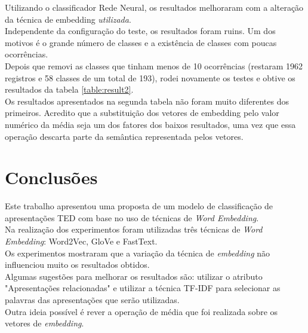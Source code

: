 \documentclass{article}
\begin{document}
Utilizando o classificador Rede Neural, os resultados melhoraram com a alteração da técnica de embedding \textit{utilizada}.\\

Independente da configuração do teste, os resultados foram ruins. Um dos motivos é o grande número de classes e a existência de classes com poucas ocorrências.\\

Depois que removi as classes que tinham menos de 10 ocorrências (restaram 1962 registros e 58 classes de um total de 193), rodei novamente os testes e obtive os resultados da tabela \ref{table:result2}.\\

Os resultados apresentados na segunda tabela não foram muito diferentes dos primeiros. Acredito que a substituição dos vetores de embedding pelo valor numérico da média seja um dos fatores dos baixos resultados, uma vez que essa operação descarta parte da semântica representada pelos vetores.


\section{Conclusões}

Este trabalho apresentou uma proposta de um modelo de classificação de apresentações TED com base no uso de técnicas de \textit{Word Embedding}.\\

Na realização dos experimentos foram utilizadas três técnicas de \textit{Word Embedding}: Word2Vec, GloVe e FastText.\\

Os experimentos mostraram que a variação da técnica de \textit{embedding} não influenciou muito os resultados obtidos.\\

Algumas sugestões para melhorar os resultados são: utilizar o atributo "Apresentações relacionadas" e utilizar a técnica TF-IDF para selecionar as palavras das apresentações que serão utilizadas.\\

Outra ideia possível é rever a operação de média que foi realizada sobre os vetores de \textit{embedding}.




\end{document}
